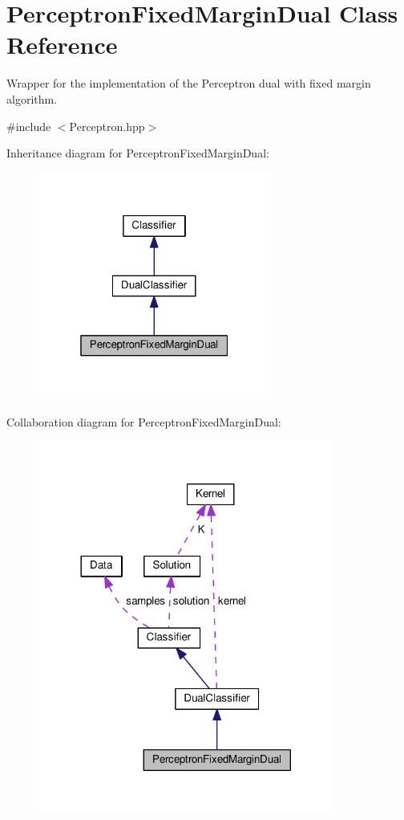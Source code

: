 \hypertarget{class_perceptron_fixed_margin_dual}{}\section{Perceptron\+Fixed\+Margin\+Dual Class Reference}
\label{class_perceptron_fixed_margin_dual}


Wrapper for the implementation of the Perceptron dual with fixed margin algorithm.  




{\ttfamily \#include $<$Perceptron.\+hpp$>$}



Inheritance diagram for Perceptron\+Fixed\+Margin\+Dual\+:\nopagebreak
\begin{figure}[H]
\begin{center}
\leavevmode
\includegraphics[width=217pt]{class_perceptron_fixed_margin_dual__inherit__graph}
\end{center}
\end{figure}


Collaboration diagram for Perceptron\+Fixed\+Margin\+Dual\+:\nopagebreak
\begin{figure}[H]
\begin{center}
\leavevmode
\includegraphics[width=276pt]{class_perceptron_fixed_margin_dual__coll__graph}
\end{center}
\end{figure}
